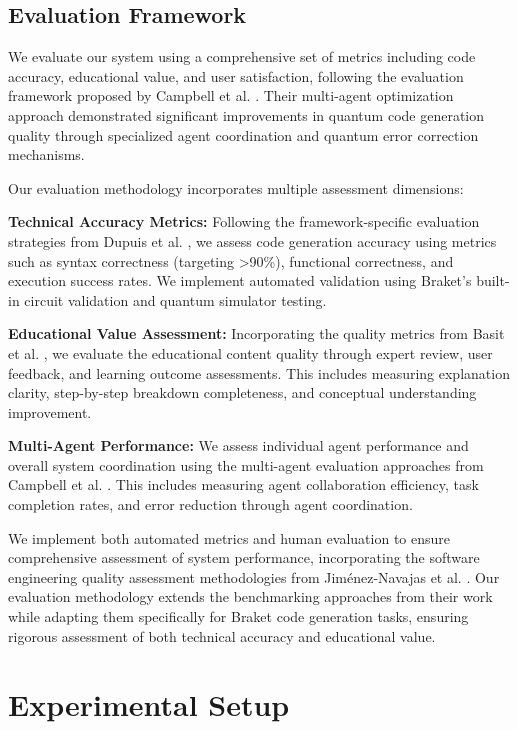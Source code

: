 \documentclass[runningheads]{llncs}
\begin{document}
\subsection{Evaluation Framework}
We evaluate our system using a comprehensive set of metrics including code accuracy, educational value, and user satisfaction, following the evaluation framework proposed by Campbell et al. \cite{campbell2025enhancingllmbasedquantumcode}. Their multi-agent optimization approach demonstrated significant improvements in quantum code generation quality through specialized agent coordination and quantum error correction mechanisms.

Our evaluation methodology incorporates multiple assessment dimensions:

\textbf{Technical Accuracy Metrics:} Following the framework-specific evaluation strategies from Dupuis et al. \cite{10691762}, we assess code generation accuracy using metrics such as syntax correctness (targeting >90\%), functional correctness, and execution success rates. We implement automated validation using Braket's built-in circuit validation and quantum simulator testing.

\textbf{Educational Value Assessment:} Incorporating the quality metrics from Basit et al. \cite{basit2025pennylangpioneeringllmbasedquantum}, we evaluate the educational content quality through expert review, user feedback, and learning outcome assessments. This includes measuring explanation clarity, step-by-step breakdown completeness, and conceptual understanding improvement.

\textbf{Multi-Agent Performance:} We assess individual agent performance and overall system coordination using the multi-agent evaluation approaches from Campbell et al. \cite{campbell2025enhancingllmbasedquantumcode}. This includes measuring agent collaboration efficiency, task completion rates, and error reduction through agent coordination.

We implement both automated metrics and human evaluation to ensure comprehensive assessment of system performance, incorporating the software engineering quality assessment methodologies from Jiménez-Navajas et al. \cite{jimenez2025codegeneration}. Our evaluation methodology extends the benchmarking approaches from their work while adapting them specifically for Braket code generation tasks, ensuring rigorous assessment of both technical accuracy and educational value.

\section{Experimental Setup}
\end{document}
